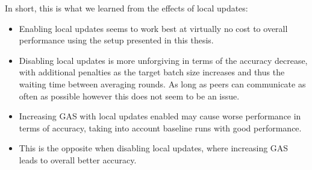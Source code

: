 In short, this is what we learned from the effects of local updates:
\begin{itemize}
    \item Enabling local updates seems to work best at virtually no cost to overall performance using the setup presented in this thesis.
    \item Disabling local updates is more unforgiving in terms of the accuracy decrease, with additional penalties as the target batch size increases and thus the waiting time between averaging rounds.
          As long as peers can communicate as often as possible however this does not seem to be an issue.
    \item Increasing GAS with local updates enabled may cause worse performance in terms of accuracy, taking into account baseline runs with good performance.
    \item This is the opposite when disabling local updates, where increasing GAS leads to overall better accuracy.
\end{itemize}

